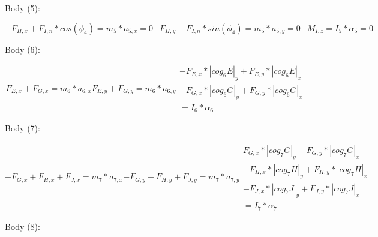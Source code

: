 \documentclass[a4paper]{article}
\begin{document}
Body (5):

\begin{subequations}
	\begin{equation}
		-F_{H,x}+F_{I,n}*cos(\phi_4)=m_5*a_{5,x}=0
	\end{equation}
	\begin{equation}
		-F_{H,y}-F_{I,n}*sin(\phi_4)=m_5*a_{5,y}=0
	\end{equation}
	\begin{equation}
		-M_{I,z}=I_5*\alpha_5=0
	\end{equation}
\end{subequations}

Body (6):

\begin{subequations}
	\begin{equation}
		F_{E,x}+F_{G,x}=m_6*a_{6,x}
	\end{equation}
	\begin{equation}
		F_{E,y}+F_{G,y}=m_6*a_{6,y}
	\end{equation}
	\begin{equation}
	\begin{split}
		-F_{E,x}*|cog_6E|_y+F_{E,y}*|cog_6E|_x\\-F_{G,x}*|cog_6G|_y+F_{G,y}*|cog_6G|_x\\=I_6*\alpha_6
	\end{split}
	\end{equation}
\end{subequations}

Body (7):

\begin{subequations}
	\begin{equation}
		-F_{G,x}+F_{H,x}+F_{J,x}=m_7*a_{7,x}
	\end{equation}
	\begin{equation}
		-F_{G,y}+F_{H,y}+F_{J,y}=m_7*a_{7,y}
	\end{equation}
	\begin{equation}
	\begin{split}
		F_{G,x}*|cog_7G|_y-F_{G,y}*|cog_7G|_x\\-F_{H,x}*|cog_7H|_y+F_{H,y}*|cog_7H|_x\\-F_{J,x}*|cog_7J|_y+F_{J,y}*|cog_7J|_x\\=I_7*\alpha_7
		\end{split}
	\end{equation}
\end{subequations}

Body (8):
\end{document}
